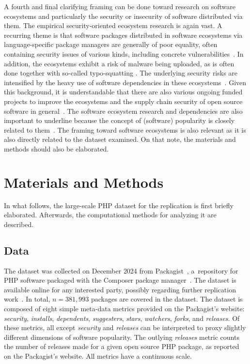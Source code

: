 \documentclass[5p, twocolumn, numbers, sort]{elsarticle}
\begin{document}
A fourth and final clarifying framing can be done toward research on software
ecosystems and particularly the security or insecurity of software distributed
via them. The empirical security-oriented ecosystem research is again vast. A
recurring theme is that software packages distributed in software ecosystems via
language-specific package managers are generally of poor equality, often
containing security issues of various kinds, including concrete
vulnerabilities~\cite{Ruohonen21PST}. In addition, the ecosystems exhibit a risk
of malware being uploaded, as is often done together with so-called
typo-squatting \cite{Ruohonen18IWESEP, Vaidya19}. The underlying security risks
are intensified by the heavy use of software dependencies in these
ecosystems~\cite{Zerouali22}. Given this background, it is understandable that
there are also various ongoing funded projects to improve the ecosystems and the
supply chain security of open source software in
general~\cite{Ruohonen24JSS}. The software ecosystem research and dependencies
are also important to underline because the concept of (software) popularity is
closely related to them~\cite{Kula18, Qiu18}. The framing toward software
ecosystems is also relevant as it is also directly related to the dataset
examined. On that note, the materials and methods should also be elaborated.

\section{Materials and Methods}\label{sec: materials and methods}

In what follows, the large-scale PHP dataset for the replication is first
briefly elaborated. Afterwards, the computational methods for analyzing it are
described.

\subsection{Data}\label{subsec: data}

The dataset was collected on December 2024 from Packagist~\cite{Packagist},
a~repository for PHP software packaged with the Composer package
manager~\cite{Composer}. The dataset is available online for any interested
party, possibly regarding further replication work~\cite{Ruohonen25a}. In total,
$n = 381,993$ packages are covered in the dataset. The dataset is composed of
eight simple meta-data metrics provided on the Packagist's website:
\textit{security}, \textit{installs}, \textit{dependents}, \textit{suggesters},
\textit{stars}, \textit{watchers}, \textit{forks}, and \textit{releases}. Of
these metrics, all except \textit{security} and \textit{releases} can be
interpreted to proxy slightly different dimensions of software popularity. The
outlying \textit{releases} metric counts the number of releases made for a given
open source PHP package, as reported on the Packagist's website. All metrics
have a continuous scale.
\end{document}
